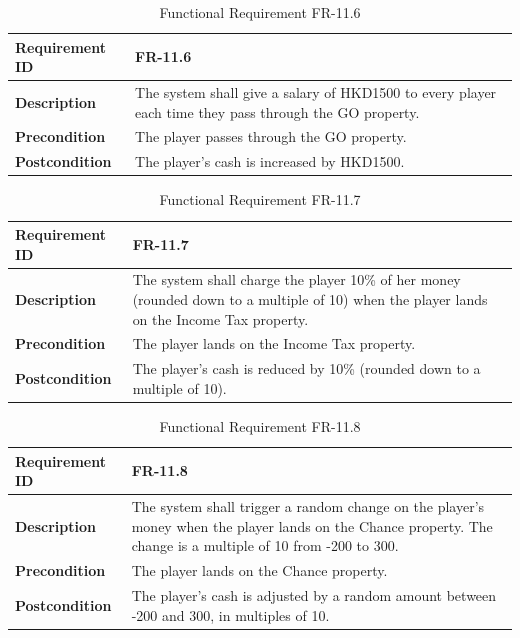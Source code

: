 \documentclass{article}
\begin{document}
\begin{table}[ht]
    \centering
    \caption{Functional Requirement FR-11.6}
    \begin{tabular}{@{}P{3cm}P{12cm}@{}}
        \toprule
        \textbf{Requirement ID} & FR-11.6 \\ \midrule
        \textbf{Description} & The system shall give a salary of HKD1500 to every player each time they pass through the GO property. \\ \midrule
        \textbf{Precondition} & The player passes through the GO property. \\ \midrule
        \textbf{Postcondition} & The player's cash is increased by HKD1500. \\ \bottomrule
    \end{tabular}
\end{table}

\begin{table}[ht]
    \centering
    \caption{Functional Requirement FR-11.7}
    \begin{tabular}{@{}P{3cm}P{12cm}@{}}
        \toprule
        \textbf{Requirement ID} & FR-11.7 \\ \midrule
        \textbf{Description} & The system shall charge the player 10\% of her money (rounded down to a multiple of 10) when the player lands on the Income Tax property. \\ \midrule
        \textbf{Precondition} & The player lands on the Income Tax property. \\ \midrule
        \textbf{Postcondition} & The player's cash is reduced by 10\% (rounded down to a multiple of 10). \\ \bottomrule
    \end{tabular}
\end{table}

\begin{table}[ht]
    \centering
    \caption{Functional Requirement FR-11.8}
    \begin{tabular}{@{}P{3cm}P{12cm}@{}}
        \toprule
        \textbf{Requirement ID} & FR-11.8 \\ \midrule
        \textbf{Description} & The system shall trigger a random change on the player's money when the player lands on the Chance property. The change is a multiple of 10 from -200 to 300. \\ \midrule
        \textbf{Precondition} & The player lands on the Chance property. \\ \midrule
        \textbf{Postcondition} & The player's cash is adjusted by a random amount between -200 and 300, in multiples of 10. \\ \bottomrule
    \end{tabular}
\end{table}
\end{document}
